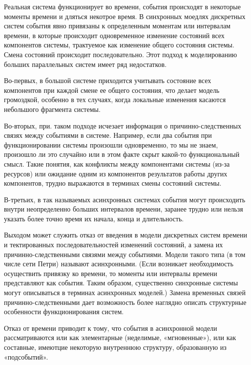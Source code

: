 Реальная система функционирует во времени, события происходят в некоторые моменты времени и дляться некотрое время. В синхронных моедлях дискретных систем события явно привязаны к определенным моментам или интервалам времени, в которые происходит одновременное изменение состояний всех компонентов системы, трактуемое как изменение общего состояния системы. Смена состояний происходит последовательно. Этот подход к моделированию больших параллельных систем имеет ряд недостатков.

Во-первых, в большой системе приходится учитывать состояние всех компонентов при каждой смене ее общего состояния, что делает модель громоздкой, особенно в тех случаях, когда локальные изменения касаются небольшого фрагмента системы.

Во-вторых, при. таком подходе исчезает информация о причинно-следственных связях между событиями в системе. Например, если два события при функционировании системы произошли одновременно, то мы не знаем, произошло ли это случайно или в этом факте скрыт какой-то функциональный смысл. Такие понятия, как конфликты между компонентами системы (из-за ресурсов) или ожидание одним из компонентов результатов работы других компонентов, трудно выражаются в терминах смены состояний системы.

В-третьих, в так называемых асинхронных системах события могут происходить внутри неопределенно больших интервалов времени, заранее трудно или нельзя указать более точно время их начала, конца и длительность.

Выходом может служить отказ от введения в модели дискретных систем времени и тектированных последовательностей изменений состояний, а замена их причинно-следственными связями между событиями. Модели такого типа (в том числе сети Петри) называют асинхронными. (Если возникает необходимость осуществить привязку ко времени, то моменты или интервалы времени представляют как события. Таким образом, существенно синхронные системы могут описываться в терминах асинхронных моделей.) Замена временных связей причинно-следственными дает возможность более наглядно описать структурные особенности функционирования систем.

Отказ от времени приводит к тому, что события в асинхронной модели рассматриваются или как элементарные (неделимые, «мгновенные»)‚ или как составные, имеютцие некоторую внутреннюю структуру, образованную
из «подсобытий».

